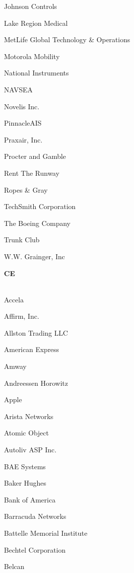 \documentclass[twoside]{article}
\begin{document}
\begin{center}
\begin{multicols}{5}
\begin{FlushLeft}
\begin{compactitem}
\item Johnson Controls
\item Lake Region Medical
\item MetLife Global Technology \& Operations
\item Motorola Mobility
\item National Instruments
\item NAVSEA
\item Novelis Inc.
\item PinnacleAIS
\item Praxair, Inc.
\item Procter and Gamble
\item Rent The Runway
\item Ropes \& Gray
\item TechSmith Corporation
\item The Boeing Company
\item Trunk Club
\item W.W. Grainger, Inc
\end{compactitem}
        \end{FlushLeft}
        \vspace{1em}
        {\fontsize{14}{16}\selectfont \bf CE}\\
        \vspace{-1em}
        ~\hrulefill~
        \vspace{-.9em}
        \begin{FlushLeft}
        \begin{compactitem}
        \item Accela
\item Affirm, Inc.
\item Allston Trading LLC
\item American Express
\item Amway
\item Andreessen Horowitz
\item Apple
\item Arista Networks
\item Atomic Object
\item Autoliv ASP Inc.
\item BAE Systems
\item Baker Hughes
\item Bank of America
\item Barracuda Networks
\item Battelle Memorial Institute
\item Bechtel Corporation
\item Belcan

\end{compactitem}
\end{FlushLeft}
\end{multicols}
\end{center}
\end{document}
